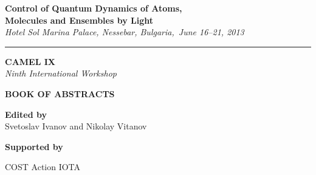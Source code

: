 \thispagestyle{empty}



\begin{center}

{\LARGE \textsf{\textbf{Control of Quantum Dynamics of Atoms,}\\ \vspace{2mm} \textbf{Molecules and Ensembles by Light} }}\\ \vspace{2mm}
{\Large \emph{Hotel Sol Marina Palace, Nessebar, Bulgaria,\ June 16--21, 2013}}

\vspace{3mm}

\hrule

\vspace{25mm}

{\fontsize{40}{48}\selectfont \textsf{\textbf{CAMEL IX}}}\\
\vspace{5mm}
{\LARGE \emph{Ninth International Workshop}}\\

\vspace{25mm}

{\fontsize{36}{40}\selectfont \textsf{\textbf{BOOK OF  ABSTRACTS}}}\\

\vspace{15mm}

\Large{\textbf{Edited by} \\ Svetoslav Ivanov and Nikolay Vitanov}

\vspace{60mm}

{\Large \textbf{Supported by}

COST Action IOTA

}




\end{center}

